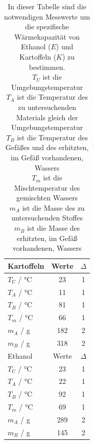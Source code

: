 \documentclass[11pt, ngerman]{scrartcl}
\begin{document}
\begin{table}[H]
    \centering
    \caption{In dieser Tabelle sind die notwendigen Messwerte um die 
        spezifische Wärmekapazität von Ethanol ($E$) und Kartoffeln ($K$) zu bestimmen. \\
    $T_U$ ist die Umgebungstemperatur \\
    $T_A$ ist die Temperatur des zu untersuchenden Materials gleich der Umgebungstemperatur \\
    $T_B$ ist die Temperatur des Gefäßes und des erhitzten, im Gefäß vorhandenen, Wassers \\
    $T_m$ ist die Mischtemperatur des gemischten Wassers \\
    $m_A$ ist die Masse des zu untersuchenden Stoffes \\
    $m_B$ ist die Masse des erhitzten, im Gefäß vorhandenen, Wassers \\
    }
    \label{tab:messwerte_stoffe}
    \begin{tabular}{l|S|S}
        Kartoffeln                    & {Werte} & {$\Delta$} \\ \hline 
        $T_U$ / \si{\celsius}                    & 23     &  1 \\ 
    	$T_A$ / \si{\celsius}                    & 11     &  1  \\
    	$T_B$ / \si{\celsius}                    & 81     &  1  \\
        $T_m$ / \si{\celsius}                    & 66     &  1  \\
        $m_A$ / \si{\g}                    & 182     & 2    \\
        $m_B$ / \si{\g}                    & 318     & 2    \\ \hline \hline
        Ethanol                    & {Werte} & {$\Delta$} \\ \hline 
        $T_U$  / \si{\celsius}                   & 23     &  1 \\ 
    	$T_A$  / \si{\celsius}                   & 22     &  1  \\
    	$T_B$  / \si{\celsius}                   & 92     &  1  \\
        $T_m$  / \si{\celsius}                   & 69     &  1  \\
        $m_A$  / \si{\g}                   & 289     & 2   \\
        $m_B$  / \si{\g}                   & 145     & 2   \\ \hline
    \end{tabular}
\end{table}
\end{document}

